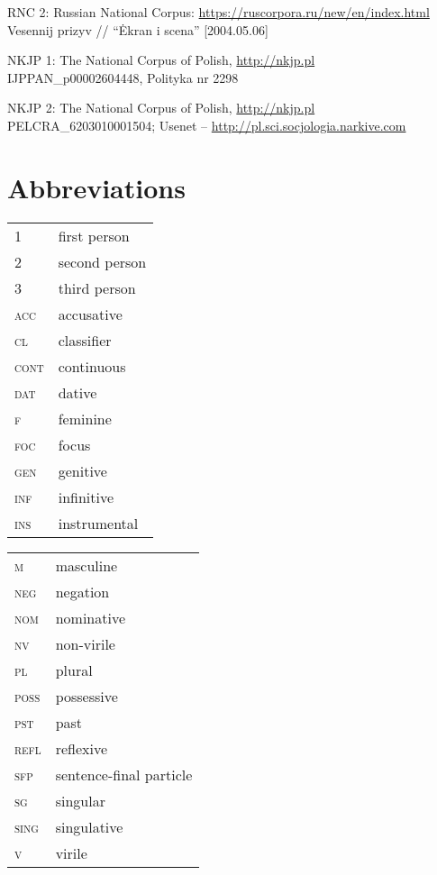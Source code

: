 \documentclass[output=paper,colorlinks,citecolor=brown]{langscibook}
\begin{document}
\noindent RNC 2: Russian National Corpus: \url{https://ruscorpora.ru/new/en/index.html}\\ Vesennij prizyv // ``Ėkran i scena'' [2004.05.06]

\noindent NKJP 1: The National Corpus of Polish, \url{http://nkjp.pl}\\ IJPPAN\_p00002604448, Polityka nr 2298

\noindent NKJP 2: The National Corpus of Polish, \url{http://nkjp.pl}\\ PELCRA\_6203010001504; Usenet -- \url{http://pl.sci.socjologia.narkive.com}


\section*{Abbreviations}

\begin{tabularx}{.5\textwidth}{@{}lQ}
1 &first person \\
2 &second person \\
3 &third person \\
\textsc{acc} &accusative \\
\textsc{cl} &classifier \\
\textsc{cont} &continuous \\
\textsc{dat} &dative \\
\textsc{f} &feminine \\
\textsc{foc} &focus \\
\textsc{gen} &genitive \\
\textsc{inf} &infinitive \\
\textsc{ins} &instrumental \\
\end{tabularx}%
\begin{tabularx}{.5\textwidth}{lQ@{}}
\textsc{m} &masculine \\
\textsc{neg} &negation \\
\textsc{nom} &nominative \\
\textsc{nv} &non-virile \\
\textsc{pl} &plural \\
\textsc{poss} &possessive \\
\textsc{pst} &past \\
\textsc{refl} &reflexive \\
\textsc{sfp} &sentence-final particle \\
\textsc{sg} &singular \\
\textsc{sing} &singulative \\
\textsc{v} &virile 
\end{tabularx}
\end{document}
